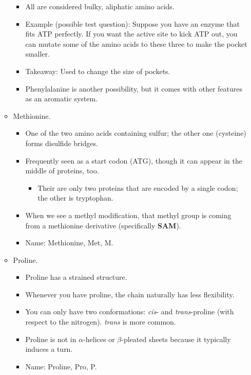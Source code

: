 \documentclass[../notes.tex]{subfiles}
\begin{document}
\begin{itemize}
\begin{itemize}
        \begin{itemize}
            \item All are considered bulky, aliphatic amino acids.
            \item Example (possible test question): Suppose you have an enzyme that fits ATP perfectly. If you want the active site to kick ATP out, you can mutate some of the amino acids to these three to make the pocket smaller.
            \item Takeaway: Used to change the size of pockets.
            \item Phenylalanine is another possibility, but it comes with other features as an aromatic system.
        \end{itemize}
        \item Methionine.
        \begin{itemize}
            \item One of the two amino acids containing sulfur; the other one (cysteine) forms disulfide bridges.
            \item Frequently seen as a start codon (ATG), though it can appear in the middle of proteins, too.
            \begin{itemize}
                \item Their are only two proteins that are encoded by a single codon; the other is tryptophan.
            \end{itemize}
            \item When we see a methyl modification, that methyl group is coming from a methionine derivative (specifically \textbf{SAM}).
            \item Name: Methionine, Met, M.
        \end{itemize}
        \item Proline.
        \begin{itemize}
            \item Proline has a strained structure.
            \item Whenever you have proline, the chain naturally has less flexibility.
            \item You can only have two conformations: \emph{cis}- and \emph{trans}-proline (with respect to the nitrogen). \emph{trans} is more common.
            \item Proline is not in $\alpha$-helices or $\beta$-pleated sheets because it typically induces a turn.
            \item Name: Proline, Pro, P.
        \end{itemize}

\end{itemize}
\end{itemize}
\end{document}
